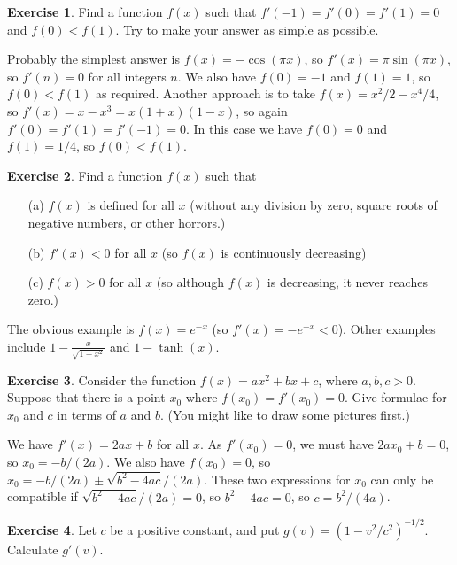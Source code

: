 \documentclass[a4paper]{amsart}
\theoremstyle{definition}
\newtheorem{exercise}{Exercise}[section]
\newenvironment{solution}{{\noindent \bf Solution:}}{}
\begin{document}
\begin{exercise}\label{ex-example-i}
Find a function $f(x)$ such that $f'(-1)=f'(0)=f'(1)=0$ and
 $f(0)<f(1)$.  Try to make your answer as simple as possible.
\end{exercise}
\begin{solution}
Probably the simplest answer is $f(x)=-\cos(\pi x)$, so
 $f'(x)=\pi\sin(\pi x)$, so $f'(n)=0$ for all integers
 $n$.  We also have $f(0)=-1$ and $f(1)=1$, so $f(0)<f(1)$
 as required.  Another approach is to take
 $f(x)=x^2/2-x^4/4$, so $f'(x)=x-x^3=x(1+x)(1-x)$, so again
 $f'(0)=f'(1)=f'(-1)=0$.  In this case we have $f(0)=0$ and
 $f(1)=1/4$, so $f(0)<f(1)$.
\end{solution}
\begin{exercise}\label{ex-example-ii}
Find a function $f(x)$ such that 
 \begin{itemize}
  \item[(a)] $f(x)$ is defined for all $x$ (without any
   division by zero, square roots of negative numbers, or
   other horrors.)
  \item[(b)] $f'(x)<0$ for all $x$ (so $f(x)$ is
   continuously decreasing)
  \item[(c)] $f(x)>0$ for all $x$ (so although $f(x)$ is
   decreasing, it never reaches zero.)
 \end{itemize}
\end{exercise}
\begin{solution}
The obvious example is $f(x)=e^{-x}$ (so
 $f'(x)=-e^{-x}<0$).  Other examples include
 $1-\frac{x}{\sqrt{1+x^2}}$ and $1-\tanh(x)$.
\end{solution}
\begin{exercise}\label{ex-quad-disc}
Consider the function $f(x)=ax^2+bx+c$, where $a,b,c>0$.
 Suppose that there is a point $x_0$ where
 $f(x_0)=f'(x_0)=0$.  Give formulae for $x_0$ and $c$ in
 terms of $a$ and $b$.  (You might like to draw some
 pictures first.)
\end{exercise}
\begin{solution}
We have $f'(x)=2ax+b$ for all $x$.  As $f'(x_0)=0$, we must
 have $2ax_0+b=0$, so $x_0=-b/(2a)$.  We also have
 $f(x_0)=0$, so $x_0=-b/(2a)\pm\sqrt{b^2-4ac}/(2a)$.  These
 two expressions for $x_0$ can only be compatible if
 $\sqrt{b^2-4ac}/(2a)=0$, so $b^2-4ac=0$, so $c=b^2/(4a)$.
\end{solution}
\begin{exercise}\label{ex-gamma}
Let $c$ be a positive constant, and put $g(v)=(1-v^2/c^2)^{-1/2}$.
 Calculate $g'(v)$.
\end{exercise}
\end{document}
